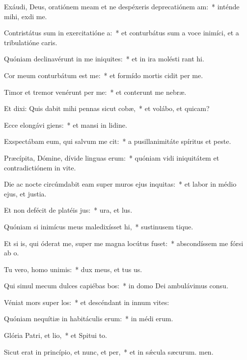 \item Exáudi, Deus, oratiónem meam et ne despéxeris deprecatiónem am:~* inténde mihi,  exdi me.
\item Contristátus sum in exercitatióne a:~* et conturbátus sum a voce inimíci, et a tribulatióne caris.
\item Quóniam declinavérunt in me iniquites:~* et in ira molésti rant hi.
\item Cor meum conturbátum est  me:~* et formído mortis cidit per me.
\item Timor et tremor venérunt per me:~* et conterunt me nebræ.
\item Et dixi: Quis dabit mihi pennas sicut cobæ,~* et volábo, et quicam?
\item Ecce elongávi giens:~* et mansi in lidine.
\item Exspectábam eum, qui salvum me cit:~* a pusillanimitáte spíritus et peste.
\item Præcípita, Dómine, dívide linguas erum:~* quóniam vidi iniquitátem et contradictiónem in vite.
\item Die ac nocte circúmdabit eam super muros ejus inquitas:~* et labor in médio ejus, et justia.
\item Et non defécit de platéis jus:~* ura, et lus.
\item Quóniam si inimícus meus maledixísset hi,~* sustinusem tique.
\item Et si is, qui óderat me, super me magna locútus fuset:~* abscondíssem me fórsi ab o.
\item Tu vero, homo unimis:~* dux meus, et tus us.
\item Qui simul mecum dulces capiébas bos:~* in domo Dei ambulávimus  consu.
\item Véniat mors super los:~* et descéndant in innum vites:
\item Quóniam nequítiæ in habitáculis erum:~* in médi erum.
\item Glória Patri, et lio,~* et Spitui to.
\item Sicut erat in princípio, et nunc, et per,~* et in sǽcula sæcurum. men.
